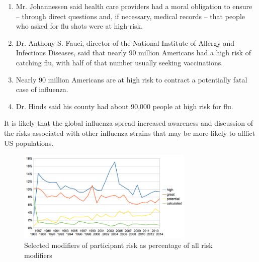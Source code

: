                 \begin{enumerate}   [before=\itshape,font=\normalfont] \setlength\itemsep{0em} \small
                    \item Mr. Johannessen said health care providers had a moral obligation to ensure -- through direct questions and, if necessary, medical records -- that people who asked for flu shots were at high risk. 
                    \item Dr. Anthony S. Fauci, director of the National Institute of Allergy and Infectious Diseases, said that nearly 90 million Americans had a high risk of catching flu, with half of that number usually seeking vaccinations. 
                    \item Nearly 90 million Americans are at high risk to contract a potentially fatal case of influenza. 
                    \item Dr. Hinds said his county had about 90,000 people at high risk for flu. 
                \end{enumerate}
                It is likely that the global influenza spread increased awareness and discussion of the risks associated with other influenza strains that may be more likely to afflict US populations. 

                


				\begin{figure}%
				\centering
				\includegraphics[width=0.75\textwidth]{../images/reladjrisk.png}
				\caption{Selected modifiers of participant risk as percentage of all risk modifiers}
				\label{fig:reladjrisk}
				\end{figure}


